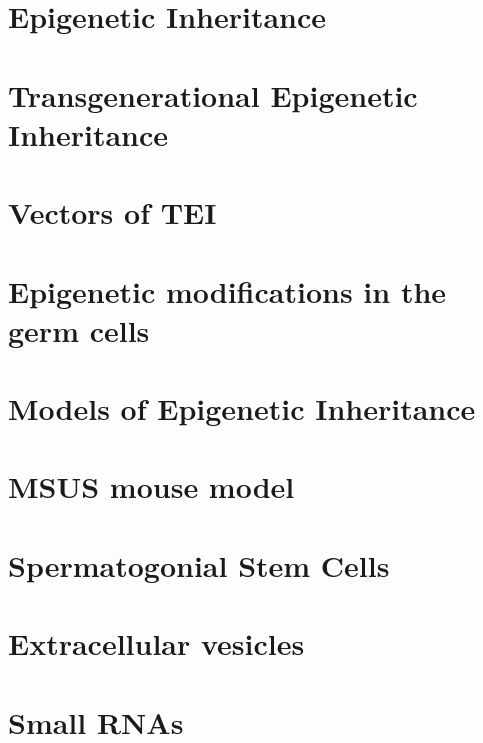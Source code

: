 \documentclass[12pt,twoside]{reedthesis}
\begin{document}
\hypertarget{epigenetic-inheritance}{%
\section{Epigenetic Inheritance}\label{epigenetic-inheritance}}

\hypertarget{transgenerational-epigenetic-inheritance}{%
\section{Transgenerational Epigenetic Inheritance}\label{transgenerational-epigenetic-inheritance}}

\hypertarget{vectors-of-tei}{%
\section{Vectors of TEI}\label{vectors-of-tei}}

\hypertarget{epigenetic-modifications-in-the-germ-cells}{%
\section{Epigenetic modifications in the germ cells}\label{epigenetic-modifications-in-the-germ-cells}}

\hypertarget{models-of-epigenetic-inheritance}{%
\section{Models of Epigenetic Inheritance}\label{models-of-epigenetic-inheritance}}

\hypertarget{msus-mouse-model}{%
\section{MSUS mouse model}\label{msus-mouse-model}}

\hypertarget{spermatogonial-stem-cells}{%
\section{Spermatogonial Stem Cells}\label{spermatogonial-stem-cells}}

\hypertarget{extracellular-vesicles}{%
\section{Extracellular vesicles}\label{extracellular-vesicles}}

\hypertarget{small-rnas}{%
\section{Small RNAs}\label{small-rnas}}
\end{document}

